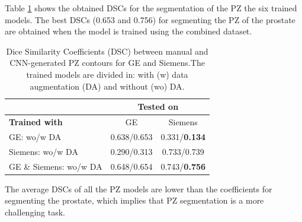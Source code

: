 Table \ref{tab:res_pz} shows the obtained DSCs for the segmentation of the PZ
the six trained models.  The best DSCs (0.653 and 0.756) for segmenting the PZ of the prostate are obtained 
when the model is trained using the combined dataset.  

\begin{table}[h]
    \centering
    \begin{tabular}{|l|c|c|}
         \hline
          & \multicolumn{2}{c|}{ \textbf{Tested on} } \\
        \hline
         \textbf{Trained with} &  GE & Siemens\\
         \hline
         GE: wo/w DA & 0.638/0.653& 0.331/\textbf{0.134} \\
         \hline
         Siemens: wo/w DA & 0.290/0.313 & 0.733/0.739\\
         \hline
         GE \& Siemens: wo/w DA & 0.648/0.654 & 0.743/\textbf{0.756}\\
         \hline
    \end{tabular}
    \caption{Dice Similarity Coefficients (DSC) between manual and CNN-generated 
    PZ contours for GE and Siemens.The trained
    models are divided in: with (w) data augmentation (DA) and without (wo) DA.}
    \label{tab:res_pz}
\end{table}

The average DSCs of all the PZ models are lower than the coefficients for 
segmenting the prostate, which implies that PZ segmentation is a more challenging task.

